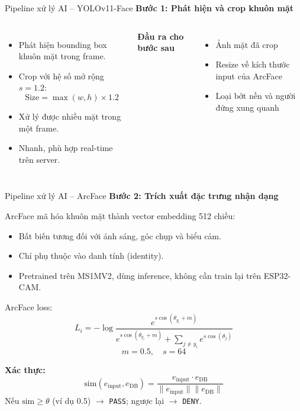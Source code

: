 \documentclass[aspectratio=169]{beamer}
\begin{document}
\begin{frame}{Pipeline xử lý AI -- YOLOv11-Face}
  \textbf{Bước 1: Phát hiện và crop khuôn mặt}

  \vspace{0.3em}
  \begin{columns}[T]
      \begin{itemize}
        \item Phát hiện bounding box khuôn mặt trong frame.
        \item Crop với hệ số mở rộng $s = 1.2$:
          \[
            \text{Size} = \max(w, h) \times 1.2
          \]
        \item Xử lý được nhiều mặt trong một frame.
        \item Nhanh, phù hợp real-time trên server.
      \end{itemize}

      \textbf{Đầu ra cho bước sau}
      \begin{itemize}
        \item Ảnh mặt đã crop
        \item Resize về kích thước input của ArcFace
        \item Loại bớt nền và người đứng xung quanh
      \end{itemize}
  \end{columns}
\end{frame}

\begin{frame}{Pipeline xử lý AI -- ArcFace}
  \footnotesize
  \textbf{Bước 2: Trích xuất đặc trưng nhận dạng}

  \vspace{0.2em}
  ArcFace mã hóa khuôn mặt thành vector embedding 512 chiều:
  \begin{itemize}\setlength{\itemsep}{0.15em}
    \item Bất biến tương đối với ánh sáng, góc chụp và biểu cảm.
    \item Chỉ phụ thuộc vào danh tính (identity).
    \item Pretrained trên MS1MV2, dùng inference, không cần train lại trên ESP32-CAM.
  \end{itemize}

  \vspace{0.25em}
  ArcFace loss:
  \[
    L_i = -\log
    \frac{e^{s\cos(\theta_{y_i}+m)}}
    {e^{s\cos(\theta_{y_i}+m)} + \sum_{j \ne y_i} e^{s\cos(\theta_j)}}
  \]
  \[
    m = 0.5,\quad s = 64
  \]

  \vspace{0.1em}
  \textbf{Xác thực:}
  \[
    \mathrm{sim}(e_{\text{input}}, e_{\text{DB}})
    =
    \frac{e_{\text{input}} \cdot e_{\text{DB}}}
    {\lVert e_{\text{input}} \rVert \lVert e_{\text{DB}} \rVert}
  \]
  Nếu $\mathrm{sim} \geq \theta$ (ví dụ $0.5$) $\to$ \texttt{PASS}; ngược lại $\to$ \texttt{DENY}.
\end{frame}
\end{document}
